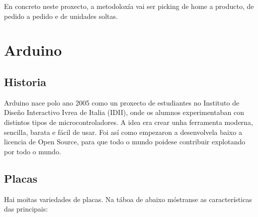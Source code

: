\documentclass[11pt,twoside]{book}
\begin{document}
En concreto neste proxecto, a metodoloxía vai ser picking de home a producto, de pedido a pedido e de unidades soltas.

\section{Arduino}
\subsection{Historia}

Arduino nace polo ano 2005 como un proxecto de estudiantes no Instituto de Diseño Interactivo Ivrea de Italia (IDII), onde os alumnos experimentaban con distintos tipos de microcontroladores. A idea era crear unha ferramenta moderna, sencilla, barata e fácil de usar. Foi así como empezaron a desenvolvela baixo a licencia de Open Source, para que todo o mundo poidese contribuir explotando por todo o mundo.

\subsection{Placas}

Hai moitas variedades de placas. Na táboa de abaixo móstranse as características das principais:
\end{document}
